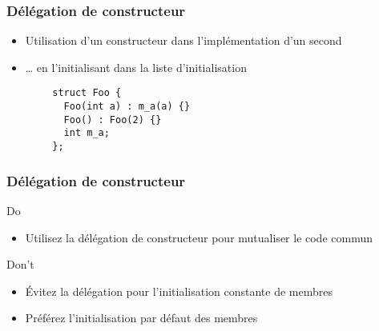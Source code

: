 \documentclass[C++.tex]{subfiles}
\begin{document}
\begin{frame}[fragile]
	\frametitle{Délégation de constructeur}
	\begin{itemize}
		\item Utilisation d'un constructeur dans l'implémentation d'un second
		\item \ldots{} en \og l'initialisant\fg{} dans la liste d'initialisation
	\end{itemize}

	\begin{verbatim}
		struct Foo {
		  Foo(int a) : m_a(a) {}
		  Foo() : Foo(2) {}
		  int m_a;
		};
	\end{verbatim}


\end{frame}

\begin{frame}[fragile]
	\frametitle{Délégation de constructeur}
	\begin{exampleblock}{Do}
		\begin{itemize}
			\item Utilisez la délégation de constructeur pour mutualiser le code commun
		\end{itemize}
	\end{exampleblock}

	\begin{alertblock}{Don't}
		\begin{itemize}
			\item Évitez la délégation pour l'initialisation constante de membres
			\item Préférez l'initialisation par défaut des membres
		\end{itemize}
	\end{alertblock}
\end{frame}
\end{document}
